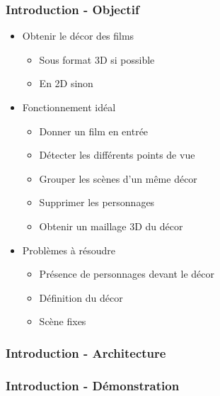  \begin{frame}
   \frametitle{Introduction - Objectif}
   
   \begin{itemize}
   \item Obtenir le décor des films
   	\begin{itemize}
   	\item Sous format 3D si possible
   	\item En 2D sinon
   	\end{itemize}
   	
   \item Fonctionnement idéal
   	\begin{itemize}
   	\item Donner un film en entrée
   	\item Détecter les différents points de vue
   	\item Grouper les scènes d'un même décor
   	\item Supprimer les personnages
   	\item Obtenir un maillage 3D du décor
   	\end{itemize}
   
   \item Problèmes à résoudre
  	\begin{itemize}
	\item Présence de personnages devant le décor
	\item Définition du décor
	\item Scène fixes
  	\end{itemize}

   \end{itemize}
	
 \end{frame}
 
\begin{frame}
  \frametitle{Introduction - Architecture}

\end{frame}


 \begin{frame}
   \frametitle{Introduction - Démonstration}


 \end{frame}
